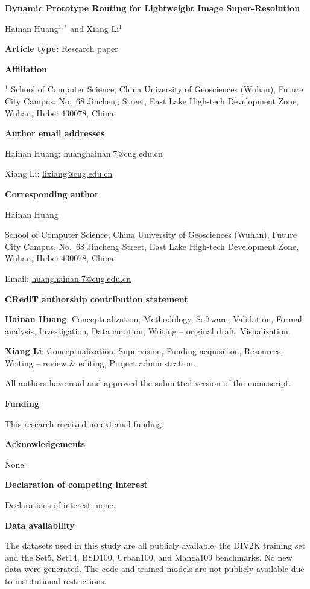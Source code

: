 \documentclass[10pt]{article}
\begin{document}
\begin{center}
{\Large\bfseries Dynamic Prototype Routing for Lightweight Image Super-Resolution\par}
\vspace{1em}
{\large Hainan Huang$^{1,*}$ and Xiang Li$^{1}$\par}
\end{center}

\textbf{Article type:} Research paper

\textbf{Affiliation}

$^{1}$ School of Computer Science, China University of Geosciences (Wuhan),
Future City Campus, No.\ 68 Jincheng Street, East Lake High-tech Development
Zone, Wuhan, Hubei 430078, China

\textbf{Author email addresses}

Hainan Huang:
\href{mailto:huanghainan.7@cug.edu.cn}{huanghainan.7@cug.edu.cn}

Xiang Li: \href{mailto:lixiang@cug.edu.cn}{lixiang@cug.edu.cn}

\textbf{Corresponding author}

Hainan Huang

School of Computer Science, China University of Geosciences (Wuhan), Future
City Campus, No.\ 68 Jincheng Street, East Lake High-tech Development Zone,
Wuhan, Hubei 430078, China

Email: \href{mailto:huanghainan.7@cug.edu.cn}{huanghainan.7@cug.edu.cn}

\medskip
\textbf{CRediT authorship contribution statement}

\textbf{Hainan Huang}: Conceptualization, Methodology, Software, Validation,
Formal analysis, Investigation, Data curation, Writing -- original draft,
Visualization.

\textbf{Xiang Li}: Conceptualization, Supervision, Funding acquisition,
Resources, Writing -- review \& editing, Project administration.

All authors have read and approved the submitted version of the manuscript.

\medskip
\textbf{Funding}

This research received no external funding.

\medskip
\textbf{Acknowledgements}

None.

\medskip
\textbf{Declaration of competing interest}

Declarations of interest: none.

\medskip
\textbf{Data availability}

The datasets used in this study are all publicly available: the DIV2K training
set and the Set5, Set14, BSD100, Urban100, and Manga109 benchmarks. No new data
were generated. The code and trained models are not publicly available due to
institutional restrictions.
\end{document}
